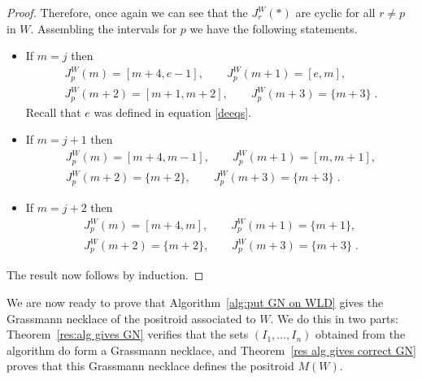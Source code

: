 \documentclass[11pt]{article}
\theoremstyle{remark}
\theoremstyle{definition}
\begin{document}
\begin{proof}
Therefore, once again we can see that the $J_r^{W}(*)$ are cyclic for all $r\neq p$ in $W$.  Assembling the intervals for $p$ we have the following statements.
\begin{itemize}
\item If $m=j$ then
\begin{gather*}J_p^{W}(m) = [m+4,e-1], \qquad  J_p^{W}(m+1) = [e,m], \\  J_p^{W}(m+2) = [m+1,m+2], \qquad  J_p^{W}(m+3) = \{m+3\}\;.\end{gather*}
Recall that $e$ was defined in equation \eqref{deeqs}.
\item If $m=j+1$ then
\begin{gather*}J_p^{W}(m) = [m+4,m-1], \qquad J_p^{W}(m+1) = [m,m+1], \\  J_p^{W}(m+2) = \{m+2\}, \qquad  J_p^{W}(m+3) = \{m+3\}\;.\end{gather*}
\item If $m=j+2$ then
\begin{gather*}J_p^{W}(m) = [m+4,m], \qquad  J_p^{W}(m+1) = \{m+1\}, \\  J_p^{W}(m+2) = \{m+2\}, \qquad  J_p^{W}(m+3) = \{m+3\}\;.\end{gather*}
\end{itemize}
The result now follows by induction.
\end{proof}
\endgroup %


We are now ready to prove that Algorithm~\ref{alg:put GN on WLD} gives the Grassmann necklace of the positroid associated to $W$. We do this in two parts: Theorem~\ref{res:alg gives GN} verifies that the sets $(I_1,\dots,I_n)$ obtained from the algorithm do form a Grassmann necklace, and Theorem~\ref{res alg gives correct GN} proves that this Grassmann necklace defines the positroid $M(W)$.
\end{document}
